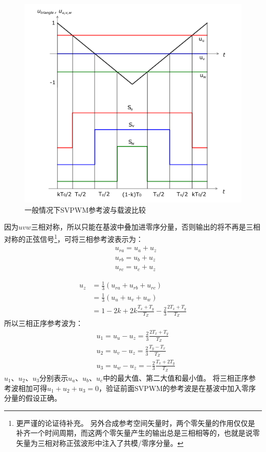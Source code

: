 \documentclass{ctexart}
\numberwithin{equation}{section}
\begin{document}
\begin{figure}[htb]
  \centering
  \includegraphics[width = .6\linewidth ]{svpwm_modulation_wave2}
  \caption{一般情况下SVPWM参考波与载波比较}
  \label{fig:svpwm-wave0}
\end{figure}

因为$uvw$三相对称，所以只能在基波中叠加进零序分量，否则输出的将不再是三相对称的正弦信号\footnote{更严谨的论证待补充。
另外合成参考空间矢量时，两个零矢量的作用仅仅是补齐一个时间周期，而这两个零矢量产生的输出总是三相相等的，也就是说零矢量为三相对称正弦波形中注入了共模/零序分量。
}，可将三相参考波表示为：
\begin{equation}
   \begin{aligned}
  	&u_{ra} = u_{a} + u_z\\
  	&u_{rb} = u_{b} + u_z\\
  	&u_{rc} = u_{c} + u_z
  \end{aligned}
\end{equation}

\begin{equation}
\begin{aligned}
	u_z &= \frac{1}{3}(u_{ra}+u_{rb}+u_{rc})\\
	&= \frac{1}{3}(u_{u}+u_{v}+u_{w})\\
	&= 1-2k+2k\frac{T_x+T_y}{T_Z} - \frac{2}{3}\frac{2T_x+T_y}{T_Z}
\end{aligned}
\end{equation}
所以三相正序参考波为：
\begin{equation}
 \begin{aligned}
 	&u_1 = u_u - u_z = \frac{2}{3}\frac{2T_x+T_y}{T_Z}\\
 	&u_2 = u_v - u_z = \frac{2}{3}\frac{T_y-T_x}{T_Z}\\
 	&u_3 = u_w - u_z = -\frac{2}{3}\frac{T_x+2T_y}{T_Z}
 \end{aligned}
\end{equation}
$ u_1 $、$ u_2 $、$ u_3 $分别表示$ u_a $、$ u_b $、$ u_c $中的最大值、第二大值和最小值。
将三相正序参考波相加可得$u_1 + u_2 + u_3 =0$，验证前面SVPWM的参考波是在基波中加入零序分量的假设正确。
\end{document}
